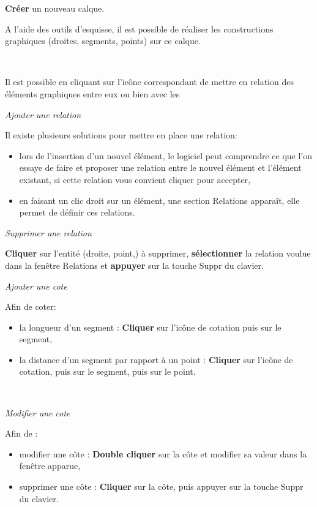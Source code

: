 \textbf{Créer} un nouveau calque.


A l'aide des outils d'esquisse, il est possible de réaliser les constructions graphiques (droites, segments, points) sur ce calque.

~\

Il est possible en cliquant sur l'icône correspondant de mettre en relation des éléments graphiques entre eux ou bien avec les 

\textit{Ajouter une relation}

Il existe plusieurs solutions pour mettre en place une relation:
\begin{itemize}
 \item lors de l'insertion d'un nouvel élément, le logiciel peut \og comprendre \fg ce que l'on essaye de faire et proposer une relation entre le nouvel élément et l'élément existant, si cette relation vous convient cliquer pour accepter,
 \item en faisant un clic droit sur un élément, une section \og Relations \fg apparaît, elle permet de définir ces relations.
\end{itemize}

\textit{Supprimer une relation}

\textbf{Cliquer} sur l'entité (droite, point,) à supprimer, \textbf{sélectionner} la relation voulue dans la fenêtre Relations et \textbf{appuyer} sur la touche Suppr du clavier.

\textit{Ajouter une cote}

Afin de coter:
\begin{itemize}
 \item la longueur d'un segment : \textbf{Cliquer} sur l'icône de cotation puis sur le segment,
 \item la distance d'un segment par rapport à un point : \textbf{Cliquer} sur l'icône de cotation, puis sur le segment, puis sur le point.
\end{itemize}

~\

\textit{Modifier une cote}

Afin de :
\begin{itemize}
 \item modifier une côte : \textbf{Double cliquer} sur la côte et modifier sa valeur dans la fenêtre apparue,
 \item supprimer une côte : \textbf{Cliquer} sur la côte, puis appuyer sur la touche Suppr du clavier.
\end{itemize}


